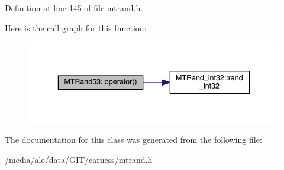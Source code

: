 Definition at line 145 of file mtrand.\-h.



Here is the call graph for this function\-:\nopagebreak
\begin{figure}[H]
\begin{center}
\leavevmode
\includegraphics[width=330pt]{a00017_ab6657cb5349f39bc4553d3a970458b45_cgraph}
\end{center}
\end{figure}




The documentation for this class was generated from the following file\-:\begin{DoxyCompactItemize}
\item 
/media/ale/data/\-G\-I\-T/carness/\hyperlink{a00041}{mtrand.\-h}\end{DoxyCompactItemize}
